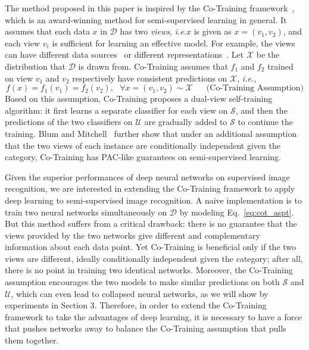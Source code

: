 \documentclass[runningheads]{llncs}
\begin{document}
The method proposed in this paper is inspired by the Co-Training framework~\cite{CoT}, which is an award-winning method for semi-supervised learning in general.
It assumes that each data $x$ in $\mathcal{D}$ has two \textit{views}, \textit{i.e.}$x$ is given as $x=(v_1, v_2)$,
and each view $v_i$ is sufficient for learning an effective model.
For example, the views can have different data sources~\cite{CoT} or different representations~\cite{cotft,cotrans,cotbow}.
Let $\mathcal{X}$ be the distribution that $\mathcal{D}$ is drawn from.
Co-Training assumes that $f_1$ and $f_2$ trained on view $v_1$ and $v_2$ respectively have consistent predictions on $\mathcal{X}$, \textit{i.e.,}\begin{equation}\label{eq:cot_aspt}
  f(x)=f_1(v_1)=f_2(v_2),~~~\forall x = (v_1, v_2)\sim\mathcal{X} \text{~~~~~(Co-Training Assumption)}
\end{equation}
Based on this assumption, Co-Training proposes a dual-view self-training algorithm:
it first learns a separate classifier for each view on $\mathcal{S}$, and then the predictions of the two classifiers on $\mathcal{U}$ are gradually added to $\mathcal{S}$ to continue the training.
Blum and Mitchell~\cite{CoT} further show that under an additional assumption that the two views of each instance are conditionally independent given the category, Co-Training has PAC-like guarantees on semi-supervised learning.

Given the superior performances of deep neural networks on supervised image recognition, we are interested in extending the Co-Training framework to apply deep learning to semi-supervised image recognition.
A naive implementation is to train two neural networks simultaneously on $\mathcal{D}$ by modeling Eq.~\ref{eq:cot_aspt}.
But this method suffers from a critical drawback: there is no guarantee that the views provided by the two networks give different and complementary information about each data point.
Yet Co-Training is beneficial only if the two views are different, ideally conditionally independent given the category;
after all, there is no point in training two identical networks.
Moreover, the Co-Training assumption encourages the two models to make similar predictions on both $\mathcal{S}$ and $\mathcal{U}$, which can even lead to collapsed neural networks, as we will show by experiments in Section 3.
Therefore, in order to extend the Co-Training framework to take the advantages of deep learning, it is necessary to have a force that pushes networks away to balance the Co-Training assumption that pulls them together.
\end{document}
